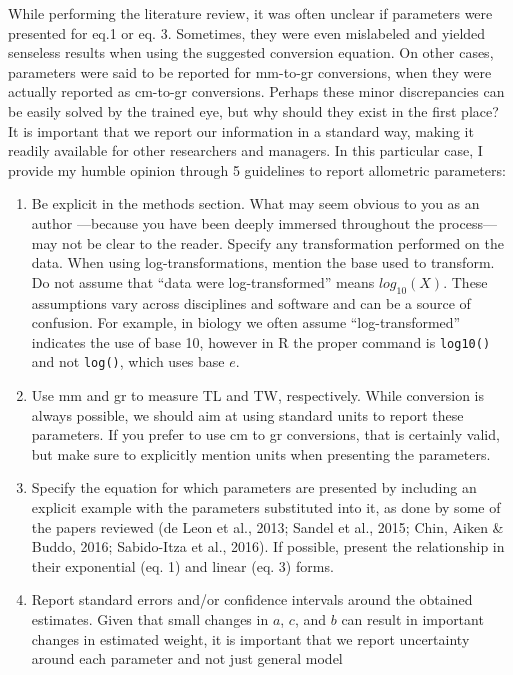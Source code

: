 \documentclass[12pt,]{article}
\begin{document}
While performing the literature review, it was often unclear if
parameters were presented for eq.1 or eq. 3. Sometimes, they were even
mislabeled and yielded senseless results when using the suggested
conversion equation. On other cases, parameters were said to be reported
for mm-to-gr conversions, when they were actually reported as cm-to-gr
conversions. Perhaps these minor discrepancies can be easily solved by
the trained eye, but why should they exist in the first place? It is
important that we report our information in a standard way, making it
readily available for other researchers and managers. In this particular
case, I provide my humble opinion through 5 guidelines to report
allometric parameters:

\begin{enumerate}
\def\labelenumi{\arabic{enumi}.}
\item
  Be explicit in the methods section. What may seem obvious to you as an
  author ---because you have been deeply immersed throughout the
  process--- may not be clear to the reader. Specify any transformation
  performed on the data. When using log-transformations, mention the
  base used to transform. Do not assume that ``data were
  log-transformed'' means \(log_{10}(X)\). These assumptions vary across
  disciplines and software and can be a source of confusion. For
  example, in biology we often assume ``log-transformed'' indicates the
  use of base 10, however in R the proper command is \texttt{log10()}
  and not \texttt{log()}, which uses base \(e\).
\item
  Use mm and gr to measure TL and TW, respectively. While conversion is
  always possible, we should aim at using standard units to report these
  parameters. If you prefer to use cm to gr conversions, that is
  certainly valid, but make sure to explicitly mention units when
  presenting the parameters.
\item
  Specify the equation for which parameters are presented by including
  an explicit example with the parameters substituted into it, as done
  by some of the papers reviewed (de Leon et al., 2013; Sandel et al.,
  2015; Chin, Aiken \& Buddo, 2016; Sabido-Itza et al., 2016). If
  possible, present the relationship in their exponential (eq. 1) and
  linear (eq. 3) forms.
\item
  Report standard errors and/or confidence intervals around the obtained
  estimates. Given that small changes in \(a\), \(c\), and \(b\) can
  result in important changes in estimated weight, it is important that
  we report uncertainty around each parameter and not just general model

\end{enumerate}
\end{document}
